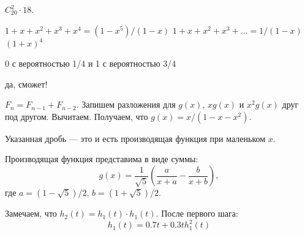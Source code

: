 \begin{solution}{23.6}
\end{solution}
\begin{solution}{24.1}
$C_{20}^2\cdot 18$.
\end{solution}
\begin{solution}{24.2}
  $1+x+x^2+x^3+x^4=(1-x^5)/(1-x)$
  $1+x+x^2+x^3+\ldots = 1/(1-x)$
  $(1+x)^4$
\end{solution}
\begin{solution}{24.3}
\end{solution}
\begin{solution}{24.4}
\end{solution}
\begin{solution}{24.5}
  0 с вероятностью 1/4 и 1 с вероятностью 3/4
\end{solution}
\begin{solution}{24.6}
  да, сможет!
\end{solution}
\begin{solution}{24.7}
$F_n = F_{n-1} + F_{n-2}$.
Запишем разложения для $g(x)$, $xg(x)$ и $x^2 g(x)$ друг под другом. Вычитаем. Получаем, что $g(x) = x/(1-x-x^2)$.

Указанная дробь — это и есть производящая функция при маленьком $x$.

Производящая функция представима в виде суммы:
\[
g(x) = \frac{1}{\sqrt{5}}\left( \frac{a}{x+a} - \frac{b}{x+b}  \right),
\]
где $a=(1-\sqrt{5})/2$, $b=(1+\sqrt{5})/2$.
\end{solution}
\begin{solution}{24.8}
Замечаем, что $h_2(t)=h_1(t)\cdot h_1(t)$. После первого шага:
\[
h_1(t) = 0.7t + 0.3th^2_1(t)
\]
\end{solution}
\begin{solution}{24.9}

\end{solution}
\begin{solution}{25.1}
\end{solution}
\begin{solution}{25.2}
\end{solution}
